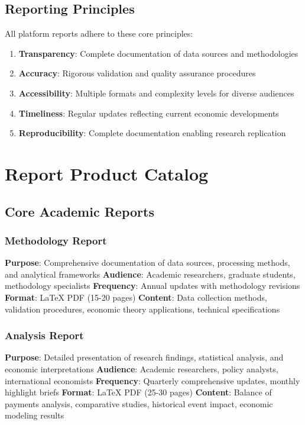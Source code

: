 \documentclass[11pt,a4paper]{article}
\begin{document}
\subsection{Reporting Principles}
All platform reports adhere to these core principles:

\begin{enumerate}
    \item \textbf{Transparency}: Complete documentation of data sources and methodologies
    \item \textbf{Accuracy}: Rigorous validation and quality assurance procedures
    \item \textbf{Accessibility}: Multiple formats and complexity levels for diverse audiences
    \item \textbf{Timeliness}: Regular updates reflecting current economic developments
    \item \textbf{Reproducibility}: Complete documentation enabling research replication
\end{enumerate}

\section{Report Product Catalog}

\subsection{Core Academic Reports}

\subsubsection{Methodology Report}
\begin{itemize}
    \textbf{Purpose}: Comprehensive documentation of data sources, processing methods, and analytical frameworks
    \textbf{Audience}: Academic researchers, graduate students, methodology specialists
    \textbf{Frequency}: Annual updates with methodology revisions
    \textbf{Format}: LaTeX PDF (15-20 pages)
    \textbf{Content}: Data collection methods, validation procedures, economic theory applications, technical specifications
\end{itemize}

\subsubsection{Analysis Report}
\begin{itemize}
    \textbf{Purpose}: Detailed presentation of research findings, statistical analysis, and economic interpretations
    \textbf{Audience}: Academic researchers, policy analysts, international economists
    \textbf{Frequency}: Quarterly comprehensive updates, monthly highlight briefs
    \textbf{Format}: LaTeX PDF (25-30 pages)
    \textbf{Content}: Balance of payments analysis, comparative studies, historical event impact, economic modeling results
\end{itemize}
\end{document}
